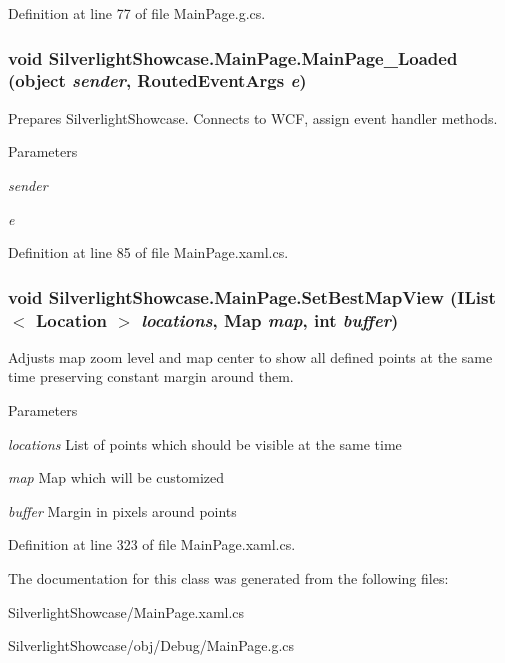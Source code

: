 Definition at line 77 of file MainPage.g.cs.\hypertarget{class_silverlight_showcase_1_1_main_page_a025641a94db81065183c64971ebda1fa}{
\subsubsection[{MainPage\_\-Loaded}]{\setlength{\rightskip}{0pt plus 5cm}void SilverlightShowcase.MainPage.MainPage\_\-Loaded (object {\em sender}, \/  RoutedEventArgs {\em e})}}
\label{class_silverlight_showcase_1_1_main_page_a025641a94db81065183c64971ebda1fa}


Prepares SilverlightShowcase. Connects to WCF, assign event handler methods. 
\begin{DoxyParams}{Parameters}
\item[{\em sender}]\item[{\em e}]\end{DoxyParams}


Definition at line 85 of file MainPage.xaml.cs.\hypertarget{class_silverlight_showcase_1_1_main_page_a1a144be96215e9b7c44e305dd49af656}{
\subsubsection[{SetBestMapView}]{\setlength{\rightskip}{0pt plus 5cm}void SilverlightShowcase.MainPage.SetBestMapView (IList$<$ Location $>$ {\em locations}, \/  Map {\em map}, \/  int {\em buffer})}}
\label{class_silverlight_showcase_1_1_main_page_a1a144be96215e9b7c44e305dd49af656}


Adjusts map zoom level and map center to show all defined points at the same time preserving constant margin around them. 
\begin{DoxyParams}{Parameters}
\item[{\em locations}]List of points which should be visible at the same time\item[{\em map}]Map which will be customized\item[{\em buffer}]Margin in pixels around points\end{DoxyParams}


Definition at line 323 of file MainPage.xaml.cs.

The documentation for this class was generated from the following files:\begin{DoxyCompactItemize}
\item 
SilverlightShowcase/MainPage.xaml.cs\item 
SilverlightShowcase/obj/Debug/MainPage.g.cs\end{DoxyCompactItemize}
